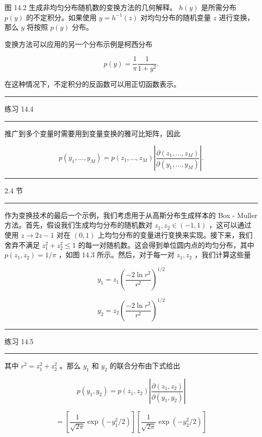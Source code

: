 \documentclass[10pt]{article}
\newcommand{\HRule}{\begin{center}\rule{0.9\linewidth}{0.2mm}\end{center}}
\begin{document}
图 14.2 生成非均匀分布随机数的变换方法的几何解释。 \(h\left( y\right)\) 是所需分布 \(p\left( y\right)\) 的不定积分。如果使用 \(y = {h}^{-1}\left( z\right)\) 对均匀分布的随机变量 \(z\) 进行变换，那么 \(y\) 将按照 \(p\left( y\right)\) 分布。

变换方法可以应用的另一个分布示例是柯西分布

\[
p\left( y\right)  = \frac{1}{\pi }\frac{1}{1 + {y}^{2}}. \tag{14.8}
\]

在这种情况下，不定积分的反函数可以用正切函数表示。

\HRule

练习 14.4

\HRule

推广到多个变量时需要用到变量变换的雅可比矩阵，因此

\[
p\left( {{y}_{1},\ldots ,{y}_{M}}\right)  = p\left( {{z}_{1},\ldots ,{z}_{M}}\right) \left| \frac{\partial \left( {{z}_{1},\ldots ,{z}_{M}}\right) }{\partial \left( {{y}_{1},\ldots ,{y}_{M}}\right) }\right| . \tag{14.9}
\]

\HRule

2.4 节

\HRule

作为变换技术的最后一个示例，我们考虑用于从高斯分布生成样本的 Box - Muller 方法。首先，假设我们生成均匀分布的随机数对 \({z}_{1},{z}_{2} \in  \left( {-1,1}\right)\) ，这可以通过使用 \(z \rightarrow  {2z} - 1\) 对在 \(\left( {0,1}\right)\) 上均匀分布的变量进行变换来实现。接下来，我们舍弃不满足 \({z}_{1}^{2} + {z}_{2}^{2} \leq  1\) 的每一对随机数。这会得到单位圆内点的均匀分布，其中 \(p\left( {{z}_{1},{z}_{2}}\right)  = 1/\pi\) ，如图 14.3 所示。然后，对于每一对 \({z}_{1},{z}_{2}\) ，我们计算这些量

\[
{y}_{1} = {z}_{1}{\left( \frac{-2\ln {r}^{2}}{{r}^{2}}\right) }^{1/2} \tag{14.10}
\]

\[
{y}_{2} = {z}_{2}{\left( \frac{-2\ln {r}^{2}}{{r}^{2}}\right) }^{1/2} \tag{14.11}
\]

\HRule

练习 14.5

\HRule

其中 \({r}^{2} = {z}_{1}^{2} + {z}_{2}^{2}\) 。那么 \({y}_{1}\) 和 \({y}_{2}\) 的联合分布由下式给出

\[
p\left( {{y}_{1},{y}_{2}}\right)  = p\left( {{z}_{1},{z}_{2}}\right) \left| \frac{\partial \left( {{z}_{1},{z}_{2}}\right) }{\partial \left( {{y}_{1},{y}_{2}}\right) }\right|
\]

\[
= \left\lbrack  {\frac{1}{\sqrt{2\pi }}\exp \left( {-{y}_{1}^{2}/2}\right) }\right\rbrack  \left\lbrack  {\frac{1}{\sqrt{2\pi }}\exp \left( {-{y}_{2}^{2}/2}\right) }\right\rbrack   \tag{14.12}
\]
\end{document}
